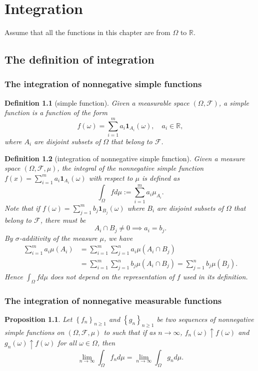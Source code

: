 \documentclass{report}
\newtheorem{definition}{Definition}[section]
\newtheorem{proposition}{Proposition}[section]
\theoremstyle{nonumberplain}
\begin{document}
\chapter{Integration}
Assume that all the functions in this chapter are from $\Omega$ to $\mathbb{R}$.
\section{The definition of integration}
\subsection{The integration of nonnegative simple functions}
\begin{definition}[simple function]
	Given a measurable space $(\Omega, \mathcal{F})$, a simple function is a function of the form
	\[
	f(\omega)=\sum_{i=1}^ma_i\mathbf{1}_{A_i}(\omega),\quad a_i\in\mathbb{R},
	\]
	where $A_i$ are disjoint subsets
	of $\Omega$ that belong to $\mathcal{F}$.
\end{definition}

\begin{definition}[integration of nonnegative simple function]
	Given a measure space $(\Omega, \mathcal{F},\mu)$, the integral of the nonnegative simple function $f(x)=\sum_{i=1}^ma_i\mathbf{1}_{A_i}(\omega)$ with respect to $\mu$
	is defined as
	\[
	\int_\Omega fd\mu:=\sum_{i=1}^ma_i\mu_{A_i}.
	\]
	Note that if $f(\omega)=\sum_{j=1}^mb_j\mathbf{1}_{B_j}(\omega)$ where $B_i$ are disjoint subsets
	of $\Omega$ that belong to $\mathcal{F}$, there must be
	\[
	A_{i} \cap B_{j} \neq 0\implies a_{i}=b_{j}.
	\]
	By $\sigma$-additivity of the measure $\mu$, we have
	\[
	\begin{aligned}
		\sum_{i=1}^{m} a_{i} \mu\left(A_{i}\right) &=\sum_{i=1}^{m} \sum_{j=1}^{n} a_{i} \mu\left(A_{i} \cap B_{j}\right) \\
		&=\sum_{i=1}^{m} \sum_{j=1}^{n} b_{j} \mu\left(A_{i} \cap B_{j}\right)=\sum_{j=1}^{n} b_{j} \mu\left(B_{j}\right).
	\end{aligned}
	\]
	Hence $\int_\Omega fd\mu$ does not depend on the representation of $f$ used in its definition.
\end{definition}
\subsection{The integration of nonnegative measurable functions}
\begin{proposition}
	Let $\left\{f_{n}\right\}_{n \ge 1}$ and $\left\{g_{n}\right\}_{n \ge 1}$ be two sequences of nonnegative simple functions on $(\Omega, \mathcal{F}, \mu)$ to such that if as $n \rightarrow \infty$, $f_{n}(\omega) \uparrow f(\omega)$ and $g_{n}(\omega) \uparrow f(\omega)$ for all $\omega \in \Omega$, then
	\[
	\lim_{n \rightarrow \infty} \int_\Omega f_{n} d \mu=\lim _{n \rightarrow \infty} \int_\Omega g_{n} d \mu.
	\]
\end{proposition}
\end{document}
